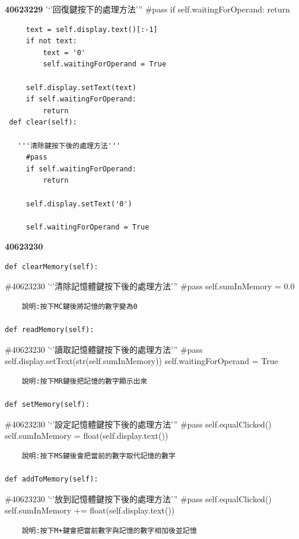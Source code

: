 \documentclass[12pt,,]{report}
\begin{document}
\textbf{40623229} '`'回復鍵按下的處理方法''' \#pass if
self.waitingForOperand: return

\begin{verbatim}
     text = self.display.text()[:-1]
     if not text:
         text = '0'
         self.waitingForOperand = True

     self.display.setText(text)
     if self.waitingForOperand:
         return
 def clear(self):
  
   '''清除鍵按下後的處理方法'''
     #pass
     if self.waitingForOperand:
         return

     self.display.setText('0')
     
     self.waitingForOperand = True
\end{verbatim}

\textbf{40623230}

\begin{verbatim}
def clearMemory(self):
\end{verbatim}

\#40623230 '`'清除記憶體鍵按下後的處理方法''' \#pass self.sumInMemory =
0.0

\begin{verbatim}
    說明:按下MC鍵後將記憶的數字變為0
    
def readMemory(self):
\end{verbatim}

\#40623230 '`'讀取記憶體鍵按下後的處理方法''' \#pass
self.display.setText(str(self.sumInMemory)) self.waitingForOperand =
True

\begin{verbatim}
    說明:按下MR鍵後把記憶的數字顯示出來
    
def setMemory(self):
\end{verbatim}

\#40623230 '`'設定記憶體鍵按下後的處理方法''' \#pass self.equalClicked()
self.sumInMemory = float(self.display.text())

\begin{verbatim}
    說明:按下MS鍵後會把當前的數字取代記憶的數字
    
def addToMemory(self):
\end{verbatim}

\#40623230 '`'放到記憶體鍵按下後的處理方法''' \#pass self.equalClicked()
self.sumInMemory += float(self.display.text())

\begin{verbatim}
    說明:按下M+鍵會把當前數字與記憶的數字相加後並記憶
\end{verbatim}
\end{document}
